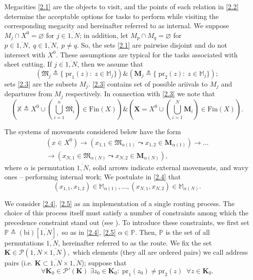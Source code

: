 \documentclass[10pt]{article}
\begin{document}
Megacities \eqref{2.1}
are the objects to visit,
and the points of each relation in \eqref{2.2}
determine the acceptable options for tasks to perform
while visiting the corresponding megacity
and hereinafter referred to as internal.
We suppose
$M_j \cap X^0 = \varnothing$
for
$j \in \overline{1,N}$;
in addition, let
$M_p \cap M_q = \varnothing$
for
$p \in \overline{1,N},\;q \in \overline{1,N},\;p \ne q$.
So,
the sets \eqref{2.1}
are pairwise disjoint and do not intersect with
$ X ^ 0 $.
These assumptions are typical for the tasks
associated with sheet cutting.
If $j \in \overline{1,N}$,
then we assume that
\begin{equation}\label{2.3}
    (\mathfrak{M}_j {\triangleq}
    \{\;\mathrm{pr}_1(z):\;z \in \mathbb{M}_j\})
    \& (\mathbf{M}_j {\triangleq}
    \{\;\mathrm{pr}_2(z):\;z \in \mathbb{M}_j\})
    ;
\end{equation}
sets \eqref{2.3}
are the subsets
$M_j$.
\eqref{2.3}
contains set of possible ariivals to
$M_j$
and departures from $M_j$
respectively.
In connection with
\eqref{2.3}
we note that
$$
(\mathbb{X} {\triangleq} X^0 \cup
(\bigcup\limits_{i=1}^n \mathfrak{M}_i) \in \mathrm{Fin}(X))
\& (\mathbf{X} = X^0 \cup (\bigcup\limits_{i=1}^N \mathbf{M}_i) \in \mathrm{Fin}(X)).
$$

The systems of movements considered below have the form
\begin{equation}\label{2.4}
  \begin{aligned}
    (x \in X^0)
    \to
    (x_{1,1} \in \mathfrak{M}_{\alpha(1)} \leadsto x_{1,2} \in \mathbf{M}_{\alpha(1)})
    \to \dots \\
    \to
    (x_{N,1} \in \mathfrak{M}_{\alpha(N)} \leadsto x_{N,2} \in \mathbf{M}_{\alpha(N)}),
  \end{aligned}
\end{equation}
where
$\alpha$ is permutation $\overline{1,N}$,
solid arrows indicate external movements,
and wavy ones --  performing internal work;
We postulate in \eqref{2.4} that
\begin{equation}\label{2.5}
  (x_{1,1},x_{1,2}) \in \mathbb{M}_{\alpha(1)},
  \dots,
  (x_{N,1},x_{N,2}) \in \mathbb{M}_{\alpha(N)}.
\end{equation}

We consider
\eqref{2.4}, \eqref{2.5}
as an implementation of a single routing process.
The choice of this process itself must satisfy
a number of constraints
among which the precedence constraint stand out
(see \cite{10}).
To introduce these constraints,
we first set
$\mathbb{P} {\triangleq} (
  \mathrm{bi})[\overline{1,N}],$
so as in \eqref{2.4}, \eqref{2.5}
$\alpha \in \mathbb{P}$.
Then,
$\mathbb{P}$
is the set of all permutations
$\overline{1,N}$,
hereinafter referred to as the route.
We fix the set
$\mathbf{K} \in \mathcal{P}(\overline{1,N} \times \overline{1,N}),$
which elements
(they all are ordered pairs)
we call address pairs
(i.e. $\mathbf{K} \subset \overline{1,N} \times \overline{1,N}$);
suppose that
\begin{equation}\label{2.6}
\forall{\mathbf{K}_0} \in \mathcal{P}'(\mathbf{K})\;\exists{z_0} \in \mathbf{K}_0:\;\mathrm{pr}_1(z_0)
\ne \mathrm{pr}_2(z)\;\;\forall{z} \in \mathbf{K}_0.
\end{equation}
\end{document}
